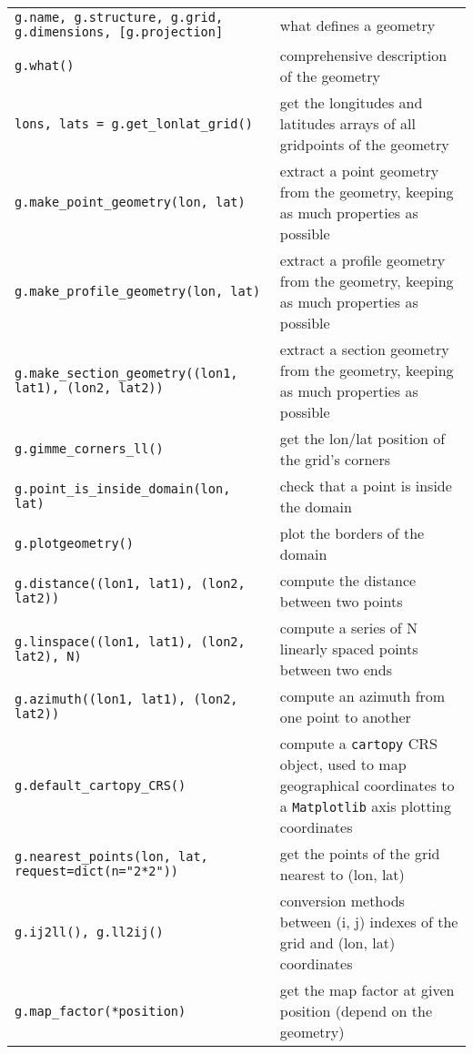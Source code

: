 \documentclass[a4paper,10pt]{article}
\begin{document}

\begin{tabular}{|p{9.5cm}|p{9.5cm}|}
\hline
\rowcolor{gray!50}
\multicolumn{2}{|c|}{\textbf{Geometries}}\\
\hline
\texttt{g.name, g.structure, g.grid, g.dimensions, [g.projection]} & what defines a geometry\\
\texttt{g.what()} & comprehensive description of the geometry\\
\texttt{lons, lats = g.get\_lonlat\_grid()} & get the longitudes and latitudes arrays of all gridpoints of the geometry\\
\texttt{g.make\_point\_geometry(lon, lat)} & extract a point geometry from the geometry, keeping as much properties as possible\\
\texttt{g.make\_profile\_geometry(lon, lat)} & extract a profile geometry from the geometry, keeping as much properties as possible\\
\texttt{g.make\_section\_geometry((lon1, lat1), (lon2, lat2))} & extract a section geometry from the geometry, keeping as much properties as possible\\
\texttt{g.gimme\_corners\_ll()} & get the lon/lat position of the grid's corners\\
\texttt{g.point\_is\_inside\_domain(lon, lat)} & check that a point is  inside the domain\\
\texttt{g.plotgeometry()} & plot the borders of the domain\\
\texttt{g.distance((lon1, lat1), (lon2, lat2))} & compute the distance between two points\\
\texttt{g.linspace((lon1, lat1), (lon2, lat2), N)} & compute a series of N linearly spaced points between two ends\\
\texttt{g.azimuth((lon1, lat1), (lon2, lat2))} & compute an azimuth from one point to another\\
\texttt{g.default\_cartopy\_CRS()} & compute a \texttt{cartopy} CRS object, used to map geographical coordinates to a \texttt{Matplotlib} axis plotting coordinates\\
\texttt{g.nearest\_points(lon, lat, request=dict(n="2*2"))} & get the points of the grid nearest to (lon, lat)\\
\texttt{g.ij2ll(), g.ll2ij()} & conversion methods between (i, j) indexes of the grid and (lon, lat) coordinates\\
\texttt{g.map\_factor(*position)} & get the map factor at given position (depend on the geometry)\\

\end{tabular}
\end{document}

